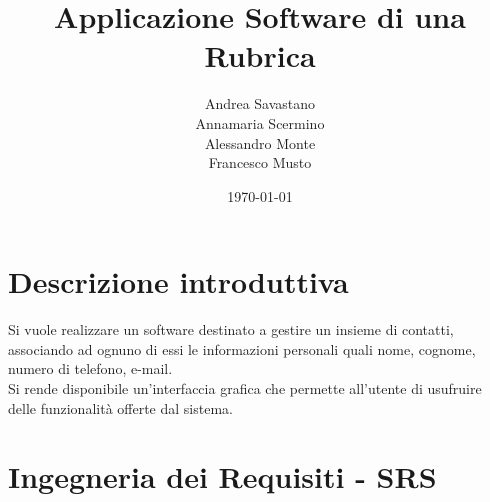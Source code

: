 \documentclass[12pt, a4paper]{article}
\title{\Huge Applicazione Software di una Rubrica}
\author{Andrea Savastano 
	\\ Annamaria Scermino
	\\ Alessandro Monte 
	\\ Francesco Musto}
\date{\today}
\begin{document}
	\fancyhf{}
	\thispagestyle{fancy}
	
	\maketitle
	\newpage
	\tableofcontents 
	\listoffigures
	
	\newpage
	\section*{Descrizione introduttiva}
	Si vuole realizzare un software destinato a gestire un insieme di contatti, associando ad ognuno di essi le informazioni personali quali nome, cognome, numero di telefono, e-mail.
	\vspace{.2cm}\\Si rende disponibile un'interfaccia grafica che permette all'utente di usufruire delle funzionalità offerte dal sistema.
	
	\newpage
	\fancyhf{} %
	\fancyhead[L]{\nouppercase{\leftmark}} %
	\section{Ingegneria dei Requisiti - SRS}
	
	
\end{document}
